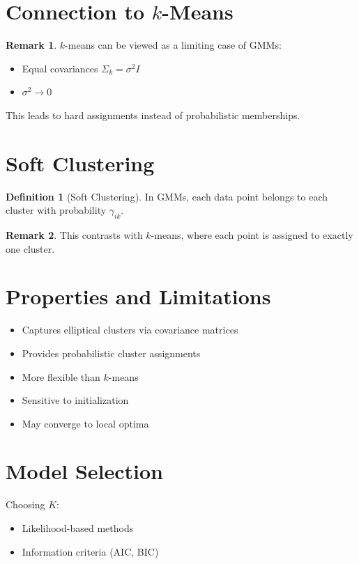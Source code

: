 \documentclass[12pt,oneside]{book}
\numberwithin{equation}{section}
\theoremstyle{definition}
\newtheorem{definition}{Definition}[section]
\newtheorem{remark}{Remark}[section]
\theoremstyle{plain}
\theoremstyle{remark}
\begin{document}
\section{Connection to $k$-Means}

\begin{remark}
$k$-means can be viewed as a limiting case of GMMs:
\begin{itemize}
    \item Equal covariances $\Sigma_k = \sigma^2 I$
    \item $\sigma^2 \to 0$
\end{itemize}
This leads to hard assignments instead of probabilistic memberships.
\end{remark}

\section{Soft Clustering}

\begin{definition}[Soft Clustering]
In GMMs, each data point belongs to each cluster with probability $\gamma_{ik}$.
\end{definition}

\begin{remark}
This contrasts with $k$-means, where each point is assigned to exactly one cluster.
\end{remark}

\section{Properties and Limitations}

\begin{itemize}
    \item Captures elliptical clusters via covariance matrices
    \item Provides probabilistic cluster assignments
    \item More flexible than $k$-means
    \item Sensitive to initialization
    \item May converge to local optima
\end{itemize}

\section{Model Selection}

Choosing $K$:
\begin{itemize}
    \item Likelihood-based methods
    \item Information criteria (AIC, BIC)
\end{itemize}
\end{document}
